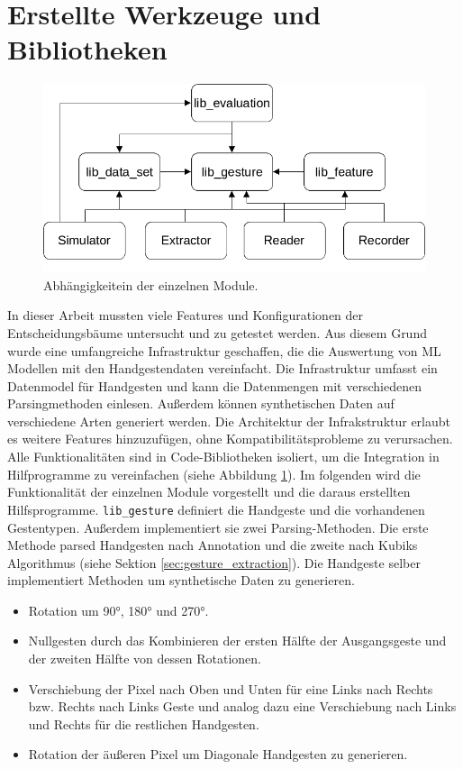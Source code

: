 \section{Erstellte Werkzeuge und Bibliotheken}
\label{sec:recorder}
\begin{figure}
    \centering
    \includegraphics[width=0.75\linewidth]{images/architecture_overview.jpg}
    \caption{Abhängigkeitein der einzelnen Module.}
    \label{fig:architecture_overview}
\end{figure}
In dieser Arbeit mussten viele Features und Konfigurationen der Entscheidungsbäume untersucht und zu getestet werden. Aus diesem Grund wurde eine umfangreiche Infrastruktur geschaffen, die die
Auswertung von ML Modellen mit den Handgestendaten vereinfacht. Die Infrastruktur umfasst ein Datenmodel für Handgesten und kann die Datenmengen mit verschiedenen Parsingmethoden einlesen.
\newline
\newline
Außerdem können synthetischen Daten auf verschiedene Arten generiert werden. Die Architektur der Infrakstruktur erlaubt es weitere Features hinzuzufügen, ohne Kompatibilitätsprobleme zu verursachen.
Alle Funktionalitäten sind in Code-Bibliotheken isoliert, um die Integration in Hilfprogramme zu vereinfachen (siehe Abbildung \ref{fig:architecture_overview}).
\newline
\newline
Im folgenden wird die Funktionalität der einzelnen Module vorgestellt und die daraus erstellten Hilfsprogramme.
\newline
\newline
\texttt{lib\_gesture} definiert die Handgeste und die vorhandenen Gestentypen. Außerdem implementiert sie zwei Parsing-Methoden. Die erste Methode parsed Handgesten nach Annotation und die
zweite nach Kubiks Algorithmus (siehe Sektion \ref{sec:gesture_extraction}). Die Handgeste selber implementiert Methoden um synthetische Daten zu generieren.
\begin{itemize}
    \item Rotation um 90°, 180° und 270°.
    \item Nullgesten durch das Kombinieren der ersten Hälfte der Ausgangsgeste und der zweiten Hälfte von dessen Rotationen.
    \item Verschiebung der Pixel nach Oben und Unten für eine Links nach Rechts bzw. Rechts nach Links Geste und analog dazu eine Verschiebung nach Links und Rechts für die restlichen Handgesten.
    \item Rotation der äußeren Pixel um Diagonale Handgesten zu generieren.
\end{itemize}
